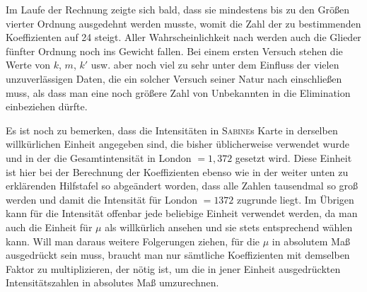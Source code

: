 Im Laufe der Rechnung zeigte sich bald, dass sie mindestens bis zu den Größen vierter Ordnung ausgedehnt werden musste, womit die Zahl der zu bestimmenden Koeffizienten auf 24 steigt. Aller Wahrscheinlichkeit nach werden auch die Glieder fünfter Ordnung noch ins Gewicht fallen. Bei einem ersten Versuch stehen die Werte von $k$, $m$, $k'$ usw. aber noch viel zu sehr unter dem Einfluss der vielen unzuverlässigen Daten, die ein solcher Versuch seiner Natur nach einschließen muss, als dass man eine noch größere Zahl von Unbekannten in die Elimination einbeziehen dürfte.

Es ist noch zu bemerken, dass die Intensitäten in \textsc{Sabine}s Karte in derselben willkürlichen Einheit angegeben sind, die bisher üblicherweise verwendet wurde und in der die Gesamtintensität in London $=1{,}372$ gesetzt wird. Diese Einheit ist hier bei der Berechnung der Koeffizienten ebenso wie in der weiter unten zu erklärenden Hilfstafel so abgeändert worden, dass alle Zahlen tausendmal so groß werden und damit die Intensität für London $=1372$ zugrunde liegt. Im Übrigen kann für die Intensität offenbar jede beliebige Einheit verwendet werden, da man auch die Einheit für $\mu$ als willkürlich ansehen und sie stets entsprechend wählen kann. Will man daraus weitere Folgerungen ziehen, für die $\mu$ in absolutem Maß ausgedrückt sein muss, braucht man nur sämtliche Koeffizienten mit demselben Faktor zu multiplizieren, der nötig ist, um die in jener Einheit ausgedrückten Intensitätszahlen in absolutes Maß umzurechnen.

